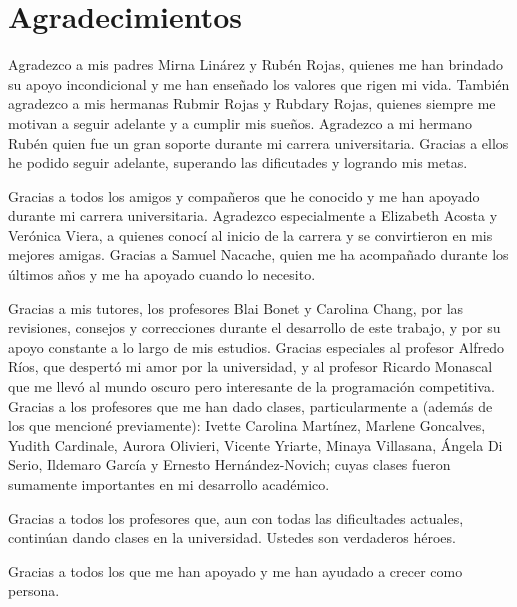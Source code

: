 \chapter*{Agradecimientos}

Agradezco a mis padres Mirna Linárez y Rubén Rojas, quienes me han brindado su apoyo incondicional y me han enseñado los valores que rigen mi vida. También agradezco a mis hermanas Rubmir Rojas y Rubdary Rojas, quienes siempre me motivan a seguir adelante y a cumplir mis sueños. Agradezco a mi hermano Rubén quien fue un gran soporte durante mi carrera universitaria. Gracias a ellos he podido seguir adelante, superando las dificutades y logrando mis metas.

Gracias a todos los amigos y compañeros que he conocido y me han apoyado durante mi carrera universitaria. Agradezco especialmente a Elizabeth Acosta y Verónica Viera, a quienes conocí al inicio de la carrera y se convirtieron en mis mejores amigas. Gracias a Samuel Nacache, quien me ha acompañado durante los últimos años y me ha apoyado cuando lo necesito.

Gracias a mis tutores, los profesores Blai Bonet y Carolina Chang, por las revisiones, consejos y correcciones durante el desarrollo de este trabajo, y por su apoyo constante a lo largo de mis estudios. Gracias especiales al profesor Alfredo Ríos, que despertó mi amor por la universidad, y al profesor Ricardo Monascal que me llevó al mundo oscuro pero interesante de la programación competitiva. Gracias a los profesores que me han dado clases, particularmente a (además de los que mencioné previamente): Ivette Carolina Martínez, Marlene Goncalves, Yudith Cardinale, Aurora Olivieri, Vicente Yriarte, Minaya Villasana, Ángela Di Serio, Ildemaro García y Ernesto Hernández-Novich; cuyas clases fueron sumamente importantes en mi desarrollo académico.

Gracias a todos los profesores que, aun con todas las dificultades actuales, continúan dando clases en la universidad. Ustedes son verdaderos héroes.

Gracias a todos los que me han apoyado y me han ayudado a crecer como persona.
